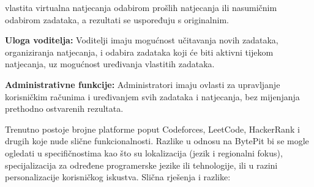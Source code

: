 \begin{packed_item}
		vlastita virtualna natjecanja odabirom prošlih natjecanja ili 
		nasumičnim odabirom zadataka, a rezultati se uspoređuju s originalnim.
    	\item \textbf{Uloga voditelja:} Voditelji imaju mogućnost učitavanja 
		novih zadataka, organiziranja natjecanja, i odabira zadataka koji će 
		biti aktivni tijekom natjecanja, uz mogućnost uređivanja vlastitih zadataka.
   		\item \textbf{Administrativne funkcije:} Administratori imaju ovlasti 
		za upravljanje korisničkim računima i uređivanjem svih zadataka i 
		natjecanja, bez mijenjanja prethodno ostvarenih rezultata.\\
		\end{packed_item}


		Trenutno postoje brojne platforme poput Codeforces, LeetCode,
		HackerRank i drugih koje nude slične funkcionalnosti. Razlike
		u odnosu na BytePit bi se mogle ogledati u specifičnostima kao
		što su lokalizacija (jezik i regionalni fokus), specijalizacija
		za određene programerske jezike ili tehnologije, ili u razini
		personalizacije korisničkog iskustva.
		Slična rješenja i razlike:
